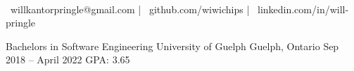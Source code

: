 \documentclass[]{awesome-cv}
\begin{document}
    
\begin{center}
	  \\
	\vspace{2mm}
	{\faEnvelope\ willkantorpringle@gmail.com} | {\faMobile\ github.com/wiwichips} | {\faMapMarker\ linkedin.com/in/will-pringle}
\end{center}
\begin{cventries}
	\cventry
	{Bachelors in Software Engineering}
	{University of Guelph}
	{Guelph, Ontario}
	{Sep 2018 – April 2022}
	{GPA: 3.65}
\end{cventries}
\end{document}
